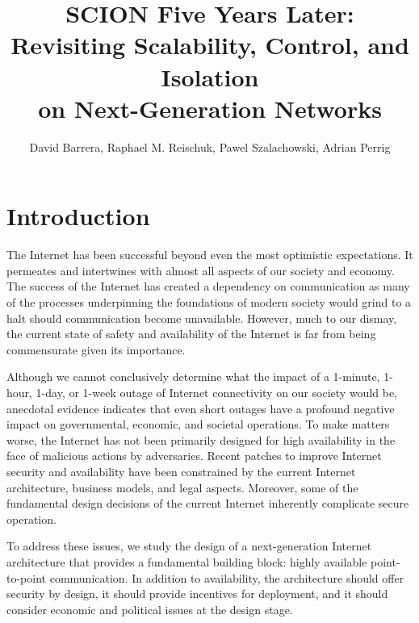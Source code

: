 \documentclass[a4paper]{llncs}
\begin{document}
\title{SCION Five Years Later:\\Revisiting Scalability, Control, and Isolation \\on Next-Generation Networks}

\author{David Barrera, Raphael M. Reischuk, Pawel Szalachowski, Adrian Perrig}

\maketitle

\thispagestyle{plain}

\section{Introduction}

The Internet has been successful beyond even the most optimistic
expectations. It permeates and intertwines with almost all aspects of
our society and economy. The success of the Internet has created a
dependency on communication as many of the processes underpinning the
foundations of modern society would grind to a halt should
communication become unavailable. However, much to our dismay, the
current state of safety and availability of the Internet is far from
being commensurate given its importance.

Although we cannot conclusively determine what the impact of a
1-minute, 1-hour, 1-day, or 1-week outage of Internet connectivity on
our society would be, anecdotal evidence indicates that even short
outages have a profound negative impact on governmental, economic, and
societal operations. To make matters worse, the Internet has not been primarily
designed for high availability in the face of malicious actions by
adversaries. Recent patches to improve Internet security and
availability have been constrained by the current Internet
architecture, business models, and legal aspects. Moreover, some of the
fundamental design decisions of the current Internet inherently
complicate secure operation.

To address these issues, we study the design of a next-generation
Internet architecture that provides a fundamental building block: highly available point-to-point
communication. In addition to availability, the architecture should
offer security by design, it should provide incentives for
deployment, and it should consider economic and political issues at
the design stage.
\end{document}
